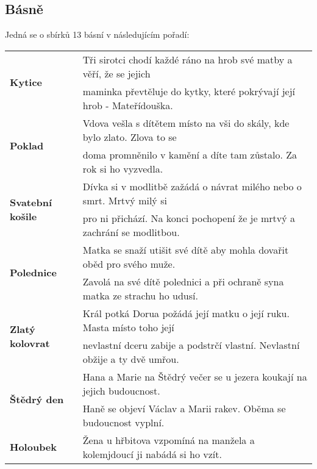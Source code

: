 \subsection*{Básně}
Jedná se o sbírků 13 básní v následujícím pořadí:\\
\begin{tabularx}{\linewidth}{l|l}
  \multirow{2}{15em}{\textbf{Kytice}}          & Tři sirotci chodí každé ráno na hrob své matby a věří, že se jejich           \\
                                               & maminka převtěluje do kytky, které pokrývají její hrob - Mateřídouška.        \\
  \hline
  \multirow{2}{15em}{\textbf{Poklad}}          & Vdova vešla s dítětem místo na vši do skály, kde bylo zlato. Zlova to se      \\
                                               & doma promněnilo v kamění a díte tam zůstalo. Za rok si ho vyzvedla.           \\
  \hline
  \multirow{2}{15em}{\textbf{Svatební košile}} & Dívka si v modlitbě zažádá o návrat milého nebo o smrt. Mrtvý milý si         \\
                                               & pro ni přichází. Na konci pochopení že je mrtvý a zachrání se modlitbou.      \\
  \hline
  \multirow{2}{15em}{\textbf{Polednice}}       & Matka se snaží utišit své dítě aby mohla dovařit oběd pro svého muže.         \\
                                               & Zavolá na své dítě polednici a při ochraně syna matka ze strachu ho udusí.    \\
  \hline
  \multirow{2}{15em}{\textbf{Zlatý kolovrat}}  & Král potká Dorua požádá její matku o její ruku. Masta místo toho její         \\
                                               & nevlastní dceru zabije a podstrčí vlastní. Nevlastní obžije a ty dvě umřou.   \\
  \hline
  \multirow{2}{15em}{\textbf{Štědrý den}}      & Hana a Marie na Štědrý večer se u jezera koukají na jejich budoucnost.        \\
                                               & Haně se objeví Václav a Marii rakev. Oběma se budoucnost vyplní.              \\
  \hline
  \multirow{2}{15em}{\textbf{Holoubek}}        & Žena u hřbitova vzpomíná na manžela a kolemjdoucí ji nabádá si ho vzít.       \\

\end{tabularx}
